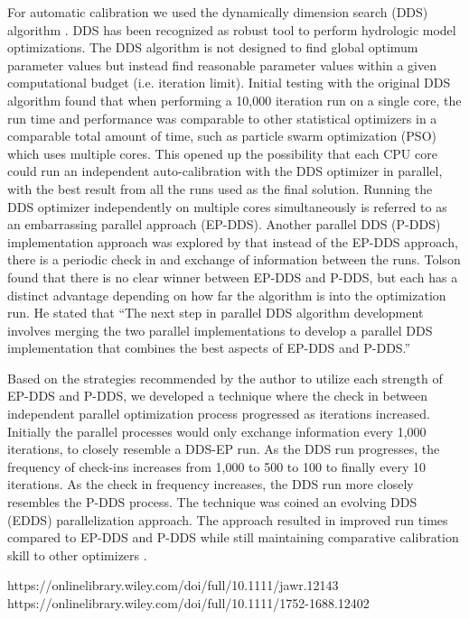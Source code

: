 \documentclass{agujournal2019}
\begin{document}
For automatic calibration we used the dynamically dimension search (DDS) algorithm \cite{Tolson2007}. DDS has been recognized as robust tool to perform hydrologic model optimizations. The DDS algorithm is not designed to find global optimum parameter values but instead find reasonable parameter values within a given computational budget (i.e. iteration limit). Initial testing with the original DDS algorithm found that when performing a 10,000 iteration run on a single core, the run time and performance was comparable to other statistical optimizers in a comparable total amount of time, such as particle swarm optimization (PSO) which uses multiple cores. This opened up the possibility that each CPU core could run an independent auto-calibration with the DDS optimizer in parallel, with the best result from all the runs used as the final solution. Running the DDS optimizer independently on multiple cores simultaneously is referred to as an embarrassing parallel approach (EP-DDS). Another parallel DDS (P-DDS) implementation approach was explored by \cite{Tolson2014} that instead of the EP-DDS approach, there is a periodic check in and exchange of information between the runs. Tolson found that there is no clear winner between EP-DDS and P-DDS, but each has a distinct advantage depending on how far the algorithm is into the optimization run. He stated that ``The next step in parallel DDS algorithm development involves merging the two parallel implementations to develop a parallel DDS implementation that combines the best aspects of EP-DDS and P-DDS.'' 

Based on the strategies recommended by the author to utilize each strength of EP-DDS and P-DDS, we developed a technique where the check in between independent parallel optimization process progressed as iterations increased. Initially the parallel processes would only exchange information every 1,000 iterations, to closely resemble a DDS-EP run. As the DDS run progresses, the frequency of check-ins increases from 1,000 to 500 to 100 to finally every 10 iterations. As the check in frequency increases, the DDS run more closely resembles the P-DDS process. The technique was coined an evolving DDS (EDDS) parallelization approach. The approach resulted in improved run times compared to EP-DDS and P-DDS while still maintaining comparative calibration skill to other optimizers \cite{Arsenault2014,Asgari2023}.

https://onlinelibrary.wiley.com/doi/full/10.1111/jawr.12143
https://onlinelibrary.wiley.com/doi/full/10.1111/1752-1688.12402
\end{document}
